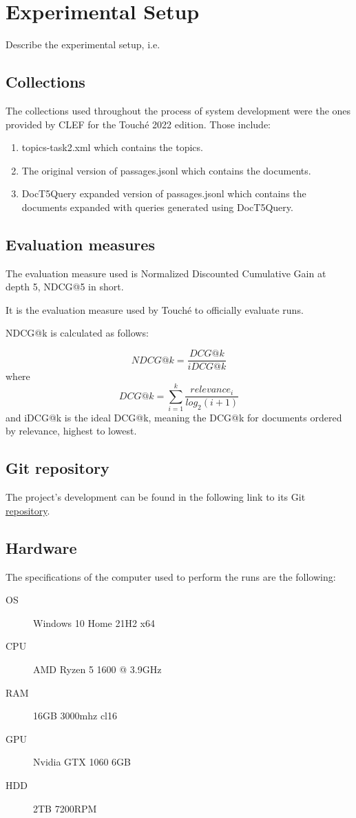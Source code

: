 \section{Experimental Setup}
\label{sec:setup}

Describe the experimental setup, i.e.

\subsection{Collections}

	The collections used throughout the process of system development were the ones provided by CLEF for the Touché 2022 edition. Those include:

	\begin{enumerate}
		\item topics-task2.xml which contains the topics.
		\item The original version of passages.jsonl which contains the documents.
		\item DocT5Query expanded version of passages.jsonl which contains the documents expanded with queries generated using DocT5Query.
	\end{enumerate}

\subsection{Evaluation measures}

	The evaluation measure used is Normalized Discounted Cumulative Gain at depth 5, NDCG@5 in short.

	It is the evaluation measure used by Touché to officially evaluate runs.

	NDCG@k is calculated as follows:

	$$
	NDCG@k = \frac{DCG@k}{iDCG@k}
	$$
	where
	$$
	DCG@k = \sum_{i=1}^{k}\frac{relevance_i}{log_2(i+1)}
	$$
	and iDCG@k is the ideal DCG@k, meaning the DCG@k for documents ordered by relevance, highest to lowest.


\subsection{Git repository}

	The project’s development can be found in the following link to its Git \href{https://bitbucket.org/upd-dei-stud-prj/seupd2122-kueri/src/master/}{repository}.
	

\subsection{Hardware}

	The specifications of the computer used to perform the runs are the following:
	\begin{description}
		\item[OS] Windows 10 Home 21H2 x64
		\item[CPU] AMD Ryzen 5 1600 @ 3.9GHz
		\item[RAM] 16GB 3000mhz cl16
		\item[GPU] Nvidia GTX 1060 6GB
		\item[HDD] 2TB 7200RPM
	\end{description}